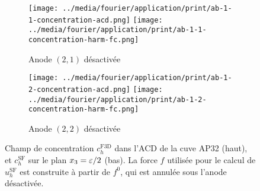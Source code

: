 \begin{figure}
\begin{center}
\begin{subfigure}[t]{\textwidth}
  \texttt{[image: ../media/fourier/application/print/ab-1-1-concentration-acd.png]}
  \texttt{[image: ../media/fourier/application/print/ab-1-1-concentration-harm-fc.png]}
  \caption{Anode $(2,1)$ désactivée}
  \label{}
\end{subfigure}

\begin{subfigure}[t]{\textwidth}
  \texttt{[image: ../media/fourier/application/print/ab-1-2-concentration-acd.png]}
  \texttt{[image: ../media/fourier/application/print/ab-1-2-concentration-harm-fc.png]}
  \caption{Anode $(2,2)$ désactivée}
  \label{}
\end{subfigure}


\caption{Champ de concentration $c_h^\mathrm{F3D}$ dans l'ACD de la
  cuve AP32 (haut), et $c_h^\mathrm{SF}$ sur le plan $x_3 = \varepsilon
  / 2$ (bas). La force $f$ utilisée pour le calcul de
  $u_h^\mathrm{SF}$ est construite à partir de $f^0$, qui est annulée
  sous l'anode désactivée.}
\label{fig:harmonic-concentration-comp-fc}
\end{center}
\end{figure}
